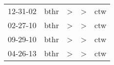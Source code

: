 \begin{supertabular}{lllll}
 12-31-02 &  bthr &  \textgreater &  \textgreater &  ctw \\
 02-27-10 &  bthr &  \textgreater &  \textgreater &  ctw \\
 09-29-10 &  bthr &  \textgreater &  \textgreater &  ctw \\
 04-26-13 &  bthr &  \textgreater &  \textgreater &  ctw \\
\end{supertabular}
